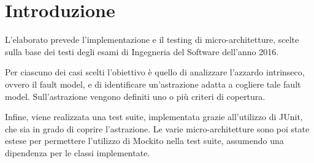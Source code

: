 \chapter{Introduzione}

L'elaborato prevede l'implementazione e il testing di micro-architetture, scelte sulla base dei testi degli esami di Ingegneria del Software dell'anno 2016.

Per ciascuno dei casi scelti l'obiettivo è quello di analizzare l'azzardo intrinseco, ovvero il fault model, e di identificare un'astrazione adatta a cogliere tale fault model. Sull'astrazione vengono definiti uno o più criteri di copertura.

Infine, viene realizzata una test suite, implementata grazie all'utilizzo di JUnit, che sia in grado di coprire l'astrazione. 
Le varie micro-architetture sono poi state estese per permettere l'utilizzo di Mockito nella test suite, assumendo una dipendenza per le classi implementate.